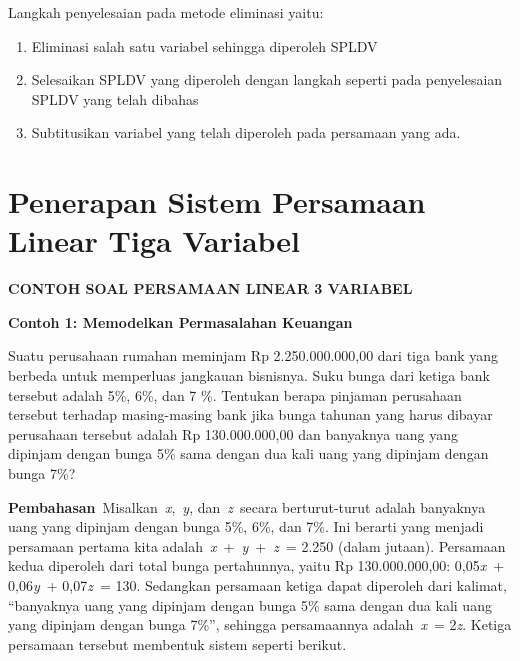 \documentclass[11pt,fleqn]{book} %
\begin{document}
\noindent Langkah penyelesaian pada metode eliminasi yaitu:

\begin{enumerate}
\item  Eliminasi salah satu variabel sehingga diperoleh SPLDV

\item  Selesaikan SPLDV yang diperoleh dengan langkah seperti pada penyelesaian SPLDV yang telah dibahas

\item  Subtitusikan variabel yang telah diperoleh pada persamaan yang ada.
\end{enumerate}

\noindent 

\noindent 


\section{Penerapan Sistem Persamaan Linear Tiga Variabel}


\noindent \textbf{CONTOH SOAL PERSAMAAN LINEAR 3 VARIABEL}

\noindent \textbf{}

\noindent \textbf{Contoh 1: Memodelkan Permasalahan Keuangan}

\noindent Suatu perusahaan rumahan meminjam Rp 2.250.000.000,00 dari tiga bank yang berbeda untuk memperluas jangkauan bisnisnya. Suku bunga dari ketiga bank tersebut adalah 5\%, 6\%, dan 7 \%. Tentukan berapa pinjaman perusahaan tersebut terhadap masing-masing bank jika bunga tahunan yang harus dibayar perusahaan tersebut adalah Rp 130.000.000,00 dan banyaknya uang yang dipinjam dengan bunga 5\% sama dengan dua kali uang yang dipinjam dengan bunga 7\%?

\noindent \textbf{}

\noindent \textbf{Pembahasan}~Misalkan~\textit{x},~\textit{y}, dan~\textit{z}~secara berturut-turut adalah banyaknya uang yang dipinjam dengan bunga 5\%, 6\%, dan 7\%. Ini berarti yang menjadi persamaan pertama kita adalah~\textit{x}~+~\textit{y}~+~\textit{z}~= 2.250 (dalam jutaan). Persamaan kedua diperoleh dari total bunga pertahunnya, yaitu Rp 130.000.000,00: 0,05\textit{x}~+ 0,06\textit{y}~+ 0,07\textit{z}~= 130. Sedangkan persamaan ketiga dapat diperoleh dari kalimat, ``banyaknya uang yang dipinjam dengan bunga 5\% sama dengan dua kali uang yang dipinjam dengan bunga 7\%'', sehingga persamaannya adalah~\textit{x}~= 2\textit{z}. Ketiga persamaan tersebut membentuk sistem seperti berikut.
\end{document}
